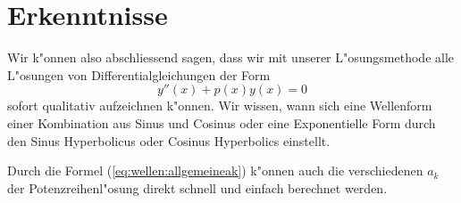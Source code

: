 \section{Erkenntnisse}

Wir k"onnen also abschliessend sagen, dass wir mit unserer L"osungsmethode alle 
L"osungen von Differentialgleichungen der Form 
\begin{equation*}
	y''(x)+p(x)y(x) = 0
\end{equation*}
sofort qualitativ aufzeichnen k"onnen. Wir wissen, wann sich eine Wellenform 
einer Kombination aus Sinus und Cosinus oder eine Exponentielle Form durch den 
Sinus Hyperbolicus oder Cosinus Hyperbolics einstellt.

Durch die Formel (\ref{eq:wellen:allgemeineak}) k"onnen auch die verschiedenen 
$a_k$ der Potenzreihenl"osung direkt schnell und einfach berechnet werden.